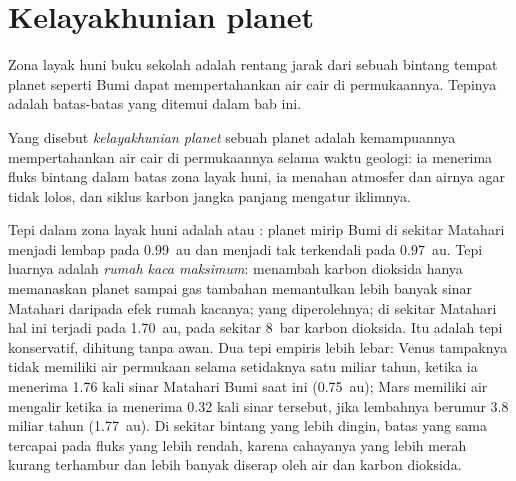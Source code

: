 \section{Kelayakhunian planet}\label{sec:b3:planetary-atmospheres:habitability}

Zona layak huni buku sekolah adalah rentang jarak dari sebuah bintang
tempat planet seperti Bumi dapat mempertahankan air cair di
permukaannya. Tepinya adalah batas-batas yang ditemui dalam bab ini.

\begin{definition}\label{def:b3:planetary-atmospheres:habitability}
Yang disebut \emph{kelayakhunian planet} sebuah
planet adalah kemampuannya mempertahankan air cair di permukaannya selama
waktu geologi: ia menerima fluks bintang dalam batas
zona layak huni, ia menahan atmosfer dan airnya agar tidak
lolos, dan siklus karbon jangka panjang mengatur iklimnya.
\end{definition}

Tepi dalam zona layak huni adalah  atau
: planet mirip Bumi di sekitar Matahari menjadi lembap pada
\qty{0.99}{au} dan menjadi tak terkendali pada \qty{0.97}{au}. Tepi luarnya adalah
\emph{rumah kaca maksimum}: menambah karbon dioksida hanya memanaskan planet sampai
gas tambahan memantulkan lebih banyak sinar Matahari daripada efek rumah kacanya;
yang diperolehnya; di sekitar Matahari hal ini terjadi pada
\qty{1.70}{au}, pada sekitar \qty{8}{bar} karbon dioksida. Itu adalah
tepi konservatif, dihitung tanpa awan. Dua tepi empiris lebih lebar:
Venus tampaknya tidak memiliki air permukaan selama setidaknya satu miliar tahun,
ketika ia menerima 1.76 kali sinar Matahari Bumi saat ini (\qty{0.75}{au});
Mars memiliki air mengalir ketika ia menerima 0.32 kali sinar tersebut, jika lembahnya
berumur 3.8 miliar tahun (\qty{1.77}{au}). Di sekitar bintang yang lebih dingin, batas yang sama tercapai
pada fluks yang lebih rendah, karena cahayanya yang lebih merah kurang terhambur dan
lebih banyak diserap oleh air dan karbon dioksida.

